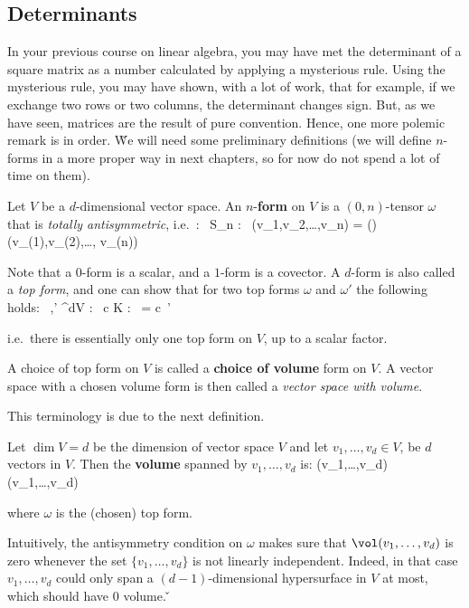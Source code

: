 \subsection{Determinants}

In your previous course on linear algebra, you may have met the determinant of a square matrix as a number calculated
by applying a mysterious rule. Using the mysterious rule, you may have shown, with a lot of work, that for example,
if we exchange two rows or two columns, the determinant changes sign. But, as we have seen, matrices are the result
of pure convention. Hence, one more polemic remark is in order. \v

We will need some preliminary definitions (we will define $n$-forms in a more proper way in next chapters, so for now
do not spend a lot of time on them).

Let $V$ be a $d$-dimensional vector space. An $n$-\textbf{form} on $V$ is a $(0,n)$-tensor $\omega$ that is
\emph{totally antisymmetric}, i.e.\ :
\bse
\forall \, \pi \in S_n : \ \omega(v_1,v_2,\ldots,v_n)
= (\pi)\, \omega(v_{\pi(1)},v_{\pi(2)},\ldots, v_{\pi(n)})
\ese
\ed

Note that a $0$-form is a scalar, and a $1$-form is a covector. A $d$-form is also called a \emph{top form}, and one
can show that for two top forms $\omega$ and $\omega'$ the following holds:
\bse
\forall \, \omega,\omega' \in \Lambda^dV : \exists \, c \in K : \ \omega = c\, \omega'
\ese

i.e.\ there is essentially only one top form on $V$, up to a scalar factor.

A choice of top form on $V$ is called a \textbf{choice of volume} form on $V$. A vector space with a chosen volume
form is then called a \emph{vector space with volume}.
\ed

This terminology is due to the next definition.

\bd [Volume]
Let $\dim V = d$ be the dimension of vector space $V$ and let $v_1,\ldots, v_d\in V$, be $d$ vectors in $V$. Then the
\textbf{volume} spanned by $v_1,\ldots,v_d$ is:
\bse
\vol(v_1,\ldots,v_d) \coloneqq \omega(v_1,\ldots,v_d)
\ese

where $\omega$ is the (chosen) top form.
\ed

Intuitively, the antisymmetry condition on $\omega$ makes sure that $\vol (v_1,\ldots,v_d)$ is zero whenever the set
$\{v_1,\ldots,v_d\}$ is not linearly independent. Indeed, in that case $v_1, \ldots,v_d$ could only span a $(d-1)
$-dimensional hypersurface in $V$ at most, which should have $0$ volume. \v

